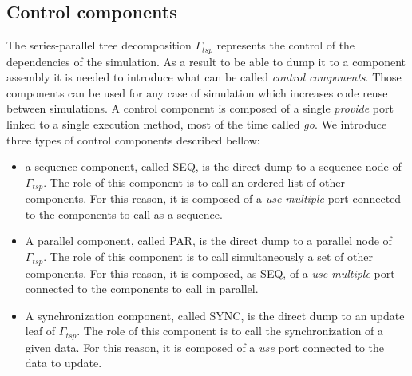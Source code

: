 \subsection{Control components}
The series-parallel tree decomposition $\Gamma_{tsp}$ represents the control of the dependencies of the simulation. As a result to be able to dump it to a component assembly it is needed to introduce what can be called \emph{control components}. Those components can be used for any case of simulation which increases code reuse between simulations. A control component is composed of a single \emph{provide} port linked to a single execution method, most of the time called \emph{go}. We introduce three types of control components described bellow:

\begin{itemize}
\item a sequence component, called SEQ, is the direct dump to a sequence node of $\Gamma_{tsp}$. The role of this component is to call an ordered list of other components. For this reason, it is composed of a \emph{use-multiple} port connected to the components to call as a sequence.


\item A parallel component, called PAR, is the direct dump to a parallel node of $\Gamma_{tsp}$. The role of this component is to call simultaneously a set of other components. For this reason, it is composed, as SEQ, of a \emph{use-multiple} port connected to the components to call in parallel.


\item A synchronization component, called SYNC, is the direct dump to an update leaf of $\Gamma_{tsp}$. The role of this component is to call the synchronization of a given data. For this reason, it is composed of a \emph{use} port connected to the data to update.

\end{itemize}

